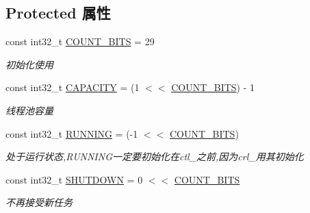 \subsection*{Protected 属性}
\begin{DoxyCompactItemize}
\item 
\mbox{\label{classThreadPoolExecutor_af82bff422304406f59a14b5b638c2b42}} 
const int32\+\_\+t \hyperlink{classThreadPoolExecutor_af82bff422304406f59a14b5b638c2b42}{C\+O\+U\+N\+T\+\_\+\+B\+I\+TS} = 29
\begin{DoxyCompactList}\small\item\em 初始化使用 \end{DoxyCompactList}\item 
\mbox{\label{classThreadPoolExecutor_aac96b726327ad0d07709085ab49c4f58}} 
const int32\+\_\+t \hyperlink{classThreadPoolExecutor_aac96b726327ad0d07709085ab49c4f58}{C\+A\+P\+A\+C\+I\+TY} = (1 $<$$<$ \hyperlink{classThreadPoolExecutor_af82bff422304406f59a14b5b638c2b42}{C\+O\+U\+N\+T\+\_\+\+B\+I\+TS}) -\/ 1
\begin{DoxyCompactList}\small\item\em 线程池容量 \end{DoxyCompactList}\item 
\mbox{\label{classThreadPoolExecutor_a9e28d5aa0cb4500921f7244565b8bed8}} 
const int32\+\_\+t \hyperlink{classThreadPoolExecutor_a9e28d5aa0cb4500921f7244565b8bed8}{R\+U\+N\+N\+I\+NG} = (-\/1 $<$$<$ \hyperlink{classThreadPoolExecutor_af82bff422304406f59a14b5b638c2b42}{C\+O\+U\+N\+T\+\_\+\+B\+I\+TS})
\begin{DoxyCompactList}\small\item\em 处于运行状态,R\+U\+N\+N\+I\+N\+G一定要初始化在ctl\+\_\+之前,因为crl\+\_\+用其初始化 \end{DoxyCompactList}\item 
\mbox{\label{classThreadPoolExecutor_aa0958f2bf040bf2f199c629ec9145b44}} 
const int32\+\_\+t \hyperlink{classThreadPoolExecutor_aa0958f2bf040bf2f199c629ec9145b44}{S\+H\+U\+T\+D\+O\+WN} = 0 $<$$<$ \hyperlink{classThreadPoolExecutor_af82bff422304406f59a14b5b638c2b42}{C\+O\+U\+N\+T\+\_\+\+B\+I\+TS}
\begin{DoxyCompactList}\small\item\em 不再接受新任务 \end{DoxyCompactList}\item 
$$
\end{DoxyCompactItemize}
